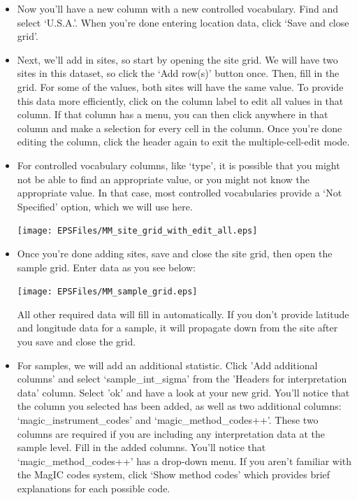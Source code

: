 \documentclass[11pt]{book}
\begin{document}
{{\begin{itemize}
    \texttt{[image: EPSFiles/MM\_add\_location\_headers.eps]}

  \item Now you'll have a new column with a new controlled vocabulary.  Find and select `U.S.A.'.  When you're done entering location data, click `Save and close grid'.

  \item Next, we'll add in sites, so start by opening the site grid.  We will have two sites in this dataset, so click the `Add row(s)' button once.  Then, fill in the grid.  For some of the values, both sites will have the same value.  To provide this data more efficiently, click on the column label to edit all values in that column.  If that column has a menu, you can then click anywhere in that column and make a selection for every cell in the column. Once you're done editing the column, click the header again to exit the multiple-cell-edit mode.
  \item For controlled vocabulary columns, like `type', it is possible that you might not be able to find an appropriate value, or you might not know the appropriate value.  In that case, most controlled vocabularies provide a `Not Specified' option, which we will use here.

    \texttt{[image: EPSFiles/MM\_site\_grid\_with\_edit\_all.eps]}

  \item Once you're done adding sites, save and close the site grid, then open the sample grid.
    Enter data as you see below:

    \texttt{[image: EPSFiles/MM\_sample\_grid.eps]}

    All other required data will fill in automatically.  If you don't provide latitude and longitude data for a sample, it will propagate down from the site after you save and close the grid.

  \item For samples, we will add an additional statistic.  Click 'Add additional columns' and select `sample\_int\_sigma' from the 'Headers for interpretation data' column.  Select 'ok' and have a look at your new grid.  You'll notice that the column you selected has been added, as well as two additional columns: `magic\_instrument\_codes' and `magic\_method\_codes++'.  These two columns are required if you are including any interpretation data at the sample level.  Fill in the added columns.  You'll notice that `magic\_method\_codes++' has a drop-down menu.  If you aren't familiar with the MagIC codes system, click `Show method codes' which provides brief explanations for each possible code.


\end{itemize}}}
\end{document}
